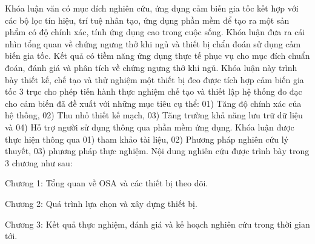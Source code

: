Khóa luận văn có mục đích nghiên cứu, ứng dụng cảm biến gia tốc kết hợp với các bộ lọc tín hiệu, trí tuệ nhân tạo, ứng dụng phần mềm để tạo ra một sản phẩm có độ chính xác, tính ứng dụng cao trong cuộc sống. Khóa luận đưa ra cái nhìn tổng quan về chứng ngưng thở khi ngủ và thiết bị chẩn đoán sử dụng cảm biến gia tốc. Kết quả có tiềm năng ứng dụng thực tế phục vụ cho mục đích chuẩn đoán, đánh giá và phân tích về chứng ngưng thở khi ngủ. Khóa luận này trình bày thiết kế, chế tạo và thử nghiệm một thiết bị đeo được tích hợp cảm biến gia tốc 3 trục cho phép tiến hành thực nghiệm chế tạo và thiết lập hệ thống đo đạc cho cảm biến đã đề xuất với những mục tiêu cụ thể: 01) Tăng độ chính xác của hệ thống, 02) Thu nhỏ thiết kế mạch, 03) Tăng trường khả năng lưu trữ dữ liệu và 04) Hỗ trợ người sử dụng thông qua phần mềm ứng dụng. Khóa luận được thực hiện thông qua 01) tham khảo tài liệu, 02) Phương pháp nghiên cứu lý thuyết, 03) phương pháp thực nghiệm. Nội dung nghiên cứu được trình bày trong 3 chương như sau:

    Chương 1: Tổng quan về OSA và các thiết bị theo dõi.

    Chương 2: Quá trình lựa chọn và xây dựng thiết bị.

    Chương 3: Kết quả thực nghiệm, đánh giá và kế hoạch nghiên cứu trong thời gian tới.
